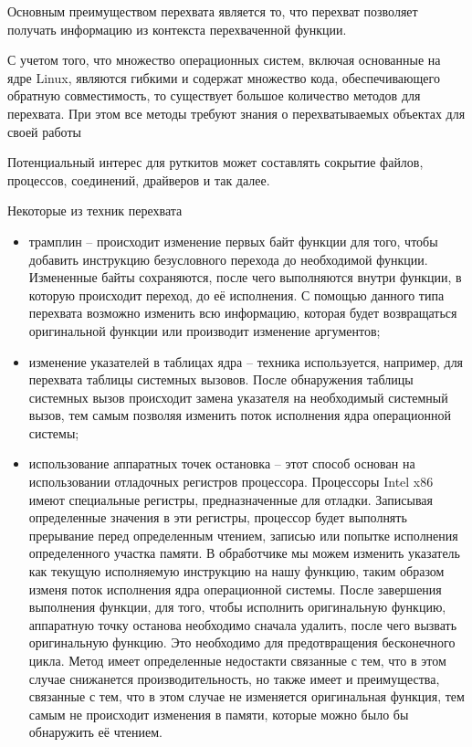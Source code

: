 \documentclass{gost7.32-2001}
\begin{document}
Основным преимуществом перехвата является то, что перехват позволяет
получать информацию из контекста перехваченной функции.

С учетом того, что множество операционных систем, включая основанные
на ядре Linux, являются гибкими и содержат множество кода,
обеспечивающего обратную совместимость, то существует большое количество
методов для перехвата. При этом все методы требуют знания о
перехватываемых объектах для своей работы

Потенциальный интерес для руткитов может составлять сокрытие файлов,
процессов, соединений, драйверов и так далее.

Некоторые из техник перехвата

\begin{itemize}
\item
  трамплин – происходит изменение первых байт функции для того, чтобы
  добавить инструкцию безусловного перехода до необходимой
  функции. Измененные байты сохраняются, после чего выполняются внутри
  функции, в которую происходит переход, до её исполнения. С помощью
  данного типа перехвата возможно изменить всю информацию, которая
  будет возвращаться оригинальной функции или производит изменение
  аргументов;
\item
  изменение указателей в таблицах ядра – техника используется,
  например, для перехвата таблицы системных вызовов. После обнаружения
  таблицы системных вызов происходит замена указателя на необходимый
  системный вызов, тем самым позволяя изменить поток исполнения ядра
  операционной системы;
\item
  использование аппаратных точек остановка – этот способ основан на
  использовании отладочных регистров процессора. Процессоры Intel x86
  имеют специальные регистры, предназначенные для отладки. Записывая
  определенные значения в эти регистры, процессор будет выполнять
  прерывание перед определенным чтением, записью или попытке исполнения
  определенного участка памяти. В обработчике мы можем изменить
  указатель как текущую исполняемую инструкцию на нашу функцию, таким
  образом изменя поток исполнения ядра операционной системы. После
  завершения выполнения функции, для того, чтобы исполнить
  оригинальную функцию, аппаратную точку останова необходимо сначала
  удалить, после чего вызвать оригинальную функцию. Это необходимо для
  предотвращения бесконечного цикла. Метод имеет определенные
  недостакти связанные с тем, что в этом случае снижанется
  производительность, но также имеет и преимущества, связанные с тем,
  что в этом случае не изменяется оригинальная функция, тем самым не
  происходит изменения в памяти, которые можно было бы обнаружить
  её чтением.
\end{itemize}
\end{document}
